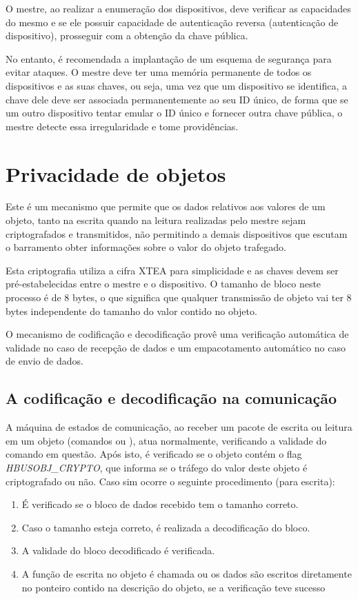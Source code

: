 \documentclass[11pt]{report}
\begin{document}
O mestre, ao realizar a enumeração dos dispositivos, deve verificar as capacidades do mesmo e se ele possuir capacidade de autenticação reversa (autenticação de dispositivo), prosseguir com a obtenção da chave pública.

No entanto, é recomendada a implantação de um esquema de segurança para evitar ataques. O mestre deve ter uma memória permanente de todos os dispositivos e as suas chaves, ou seja, uma vez que um dispositivo se identifica, a chave dele deve ser associada permanentemente ao seu ID único, de forma que se um outro dispositivo tentar emular o ID único e fornecer outra chave pública, o mestre detecte essa irregularidade e tome providências.

\section{Privacidade de objetos}

Este é um mecanismo que permite que os dados relativos aos valores de um objeto, tanto na escrita quando na leitura realizadas pelo mestre sejam criptografados e transmitidos, não permitindo a demais dispositivos que escutam o barramento obter informações sobre o valor do objeto trafegado.

Esta criptografia utiliza a cifra XTEA para simplicidade e as chaves devem ser pré-estabelecidas entre o mestre e o dispositivo. O tamanho de bloco neste processo é de 8 bytes, o que significa que qualquer transmissão de objeto vai ter 8 bytes independente do tamanho do valor contido no objeto.

O mecanismo de codificação e decodificação provê uma verificação automática de validade no caso de recepção de dados e um empacotamento automático no caso de envio de dados.

\subsection{A codificação e decodificação na comunicação}

A máquina de estados de comunicação, ao receber um pacote de escrita ou leitura em um objeto (comandos  ou ), atua normalmente, verificando a validade do comando em questão. Após isto, é verificado se o objeto contém o flag \textit{HBUSOBJ\_CRYPTO}, que informa se o tráfego do valor deste objeto é criptografado ou não. Caso sim ocorre o seguinte procedimento (para escrita):

\begin{enumerate}

\item É verificado se o bloco de dados recebido tem o tamanho correto.
\item Caso o tamanho esteja correto, é realizada a decodificação do bloco.
\item A validade do bloco decodificado é verificada.
\item A função de escrita no objeto é chamada ou os dados são escritos diretamente no ponteiro contido na descrição do objeto, se a verificação teve sucesso

\end{enumerate}
\end{document}

